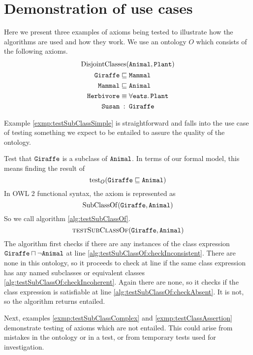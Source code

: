 \documentclass[paper.tex]{subfiles}
\begin{document}
\section{Demonstration of use cases}
\label{sec:examples}

Here we present three examples of axioms being tested to illustrate how the algorithms are used and how they work.
We use an ontology $O$ which consists of the following axioms.
\begin{gather*}
  \oaxiom{DisjointClasses}(\oent{Animal}, \oent{Plant}) \\
  \begin{aligned}
    \oent{Giraffe} &\sqsubseteq \oent{Mammal} \\
    \oent{Mammal} &\sqsubseteq \oent{Animal} \\
    \oent{Herbivore} &\equiv \forall \oent{eats} .\, \oent{Plant} \\
    \oent{Susan} &\aligncolon \oent{Giraffe}
  \end{aligned}
\end{gather*}

Example \ref{exmp:testSubClassSimple} is straightforward and falls into the use case of testing something we expect to be entailed to assure the quality of the ontology.

\begin{example}
  \label{exmp:testSubClassSimple}
  Test that $\mathtt{Giraffe}$ is a subclass of $\mathtt{Animal}$.
  In terms of our formal model, this means finding the result of
  \[ \operatorname{test}_O(\mathtt{Giraffe} \sqsubseteq \mathtt{Animal}) \]
  In OWL 2 functional syntax, the axiom is represented as
  \[ \mathrm{SubClassOf}(\mathtt{Giraffe}, \mathtt{Animal}) \]
  So we call algorithm \ref{alg:testSubClassOf}.
  \[ \Call{testSubClassOf}{\oent{Giraffe}, \oent{Animal}} \]
  The algorithm first checks if there are any instances of the class expression $\mathtt{Giraffe} \sqcap \neg \mathtt{Animal}$ at line \ref{alg:testSubClassOf:checkInconsistent}.
  There are none in this ontology, so it proceeds to check at line if the same class expression has any named subclasses or equivalent classes \ref{alg:testSubClassOf:checkIncoherent}.
  Again there are none, so it checks if the class expression is satisfiable at line \ref{alg:testSubClassOf:checkAbsent}.
  It is not, so the algorithm returns entailed.
\end{example}

Next, examples \ref{exmp:testSubClassComplex} and \ref{exmp:testClassAssertion} demonstrate testing of axioms which are not entailed.
This could arise from mistakes in the ontology or in a test, or from temporary tests used for investigation.
\end{document}
